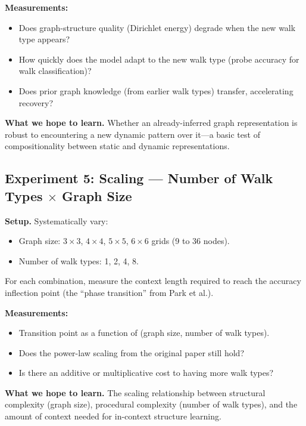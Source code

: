 \documentclass[11pt]{article}
\begin{document}
\textbf{Measurements:}
\begin{itemize}
    \item Does graph-structure quality (Dirichlet energy) degrade when the new walk type appears?
    \item How quickly does the model adapt to the new walk type (probe accuracy for walk classification)?
    \item Does prior graph knowledge (from earlier walk types) transfer, accelerating recovery?
\end{itemize}

\textbf{What we hope to learn.} Whether an already-inferred graph representation is robust to encountering a new dynamic pattern over it---a basic test of compositionality between static and dynamic representations.

\subsection{Experiment 5: Scaling --- Number of Walk Types $\times$ Graph Size}

\textbf{Setup.} Systematically vary:
\begin{itemize}
    \item Graph size: $3\times3$, $4\times4$, $5\times5$, $6\times6$ grids (9 to 36 nodes).
    \item Number of walk types: 1, 2, 4, 8.
\end{itemize}

For each combination, measure the context length required to reach the accuracy inflection point (the ``phase transition'' from Park et al.).

\textbf{Measurements:}
\begin{itemize}
    \item Transition point as a function of (graph size, number of walk types).
    \item Does the power-law scaling from the original paper still hold?
    \item Is there an additive or multiplicative cost to having more walk types?
\end{itemize}

\textbf{What we hope to learn.} The scaling relationship between structural complexity (graph size), procedural complexity (number of walk types), and the amount of context needed for in-context structure learning.

\end{document}
